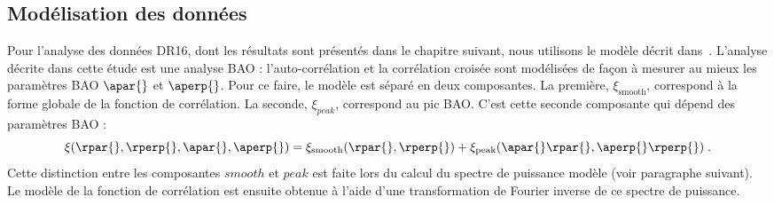 \subsection{Modélisation des données}
\label{subsec:model_donnees}
Pour l'analyse des données DR16, dont les résultats sont présentés dans le chapitre suivant, nous utilisons le modèle décrit dans~\textcite{DuMasdesBourboux2020}. L'analyse décrite dans cette étude est une analyse BAO : l'auto-corrélation et la corrélation croisée sont modélisées de façon à mesurer au mieux les paramètres BAO $\apar{}$ et $\aperp{}$.
Pour ce faire, le modèle est séparé en deux composantes. La première, $\xi_{\mathrm{smooth}}$, correspond à la forme globale de la fonction de corrélation. 
La seconde, $\xi_{peak}$, correspond au pic BAO. C'est cette seconde composante qui dépend des paramètres BAO :
\begin{equation}
  \xi(\rpar{}, \rperp{}, \apar{}, \aperp{}) = \xi_{\mathrm{smooth}}(\rpar{}, \rperp{}) + \xi_{\mathrm{peak}}(\apar{} \rpar{}, \aperp{} \rperp{}) \; .
\end{equation}
Cette distinction entre les composantes $smooth$ et $peak$ est faite lors du calcul du spectre de puissance modèle (voir paragraphe suivant). Le modèle de la fonction de corrélation est ensuite obtenue à l'aide d'une transformation de Fourier inverse de ce spectre de puissance.
